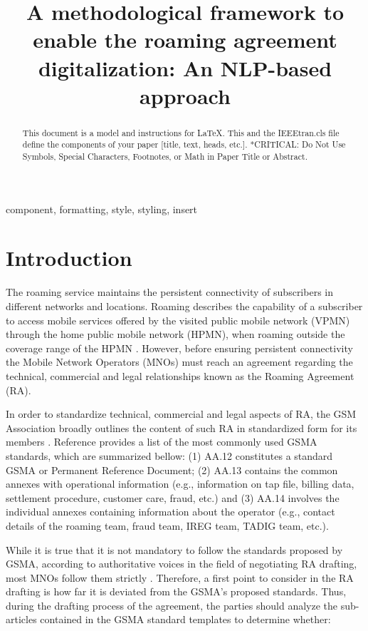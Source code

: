 \documentclass[conference]{style/IEEEtran}
\begin{document}
\title{A methodological framework to enable the roaming agreement digitalization: An NLP-based approach\\}

\maketitle

\begin{abstract}
This document is a model and instructions for \LaTeX.
This and the IEEEtran.cls file define the components of your paper [title, text, heads, etc.]. *CRITICAL: Do Not Use Symbols, Special Characters, Footnotes, 
or Math in Paper Title or Abstract.
\end{abstract}

\begin{IEEEkeywords}
component, formatting, style, styling, insert
\end{IEEEkeywords}

\section{Introduction}
The roaming service maintains the persistent connectivity of subscribers in different networks and locations. Roaming describes the capability of a subscriber to access mobile services offered by the visited public mobile network (VPMN) through the home public mobile network (HPMN), when roaming outside the coverage range of the HPMN \cite{Tanaka2013}. However, before ensuring persistent connectivity the Mobile Network Operators (MNOs) must reach an agreement regarding the technical, commercial and legal relationships known as the Roaming Agreement (RA).

In order to standardize technical, commercial and legal aspects of RA, the GSM Association broadly outlines the content of such RA in standardized form for its members \cite{Ferwerda2018}. Reference \cite{ROCCO2017} provides a list of the most commonly used GSMA standards, which are summarized bellow: (1) AA.12 constitutes a standard GSMA or Permanent Reference Document; (2) AA.13 contains the common annexes with operational information (e.g., information on tap file, billing data, settlement procedure, customer care, fraud, etc.) and (3) AA.14 involves the individual annexes containing information about the operator (e.g., contact details of the roaming team, fraud team, IREG team, TADIG team, etc.).

While it is true that it is not mandatory to follow the standards proposed by GSMA, according to authoritative voices in the field of negotiating RA drafting, most MNOs follow them strictly \cite{ROCCO2017a}. Therefore, a first point to consider in the RA drafting is how far it is deviated from the GSMA's proposed standards. Thus, during the drafting process of the agreement, the parties should analyze the sub-articles contained in the GSMA standard templates to determine whether:
\end{document}
